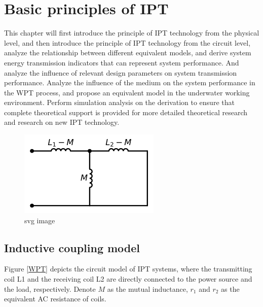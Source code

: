 \chapter{Basic principles of IPT}

This chapter will first introduce the principle of IPT technology from the physical level, and then introduce the principle of IPT technology from the circuit level, analyze the relationship between different equivalent models, and derive system energy transmission indicators that can represent system performance. And analyze the influence of relevant design parameters on system transmission performance. Analyze the influence of the medium on the system performance in the WPT process, and propose an equivalent model in the underwater working environment. Perform simulation analysis on the derivation to ensure that complete theoretical support is provided for more detailed theoretical research and research on new IPT technology.
\begin{figure}[htbp]
    \centering
    \includegraphics{images/3_mutual_inductance.png}
    \caption{svg image}
  \end{figure}

\section{Inductive coupling model}
Figure \ref{WPT} depicts the circuit model of IPT systems, where the transmitting coil L1 and the receiving coil L2 are directly connected to the power source and the load, respectively. Denote $M$ as the mutual inductance, $r_1$ and $r_2$ as the equivalent AC resistance of coils.


